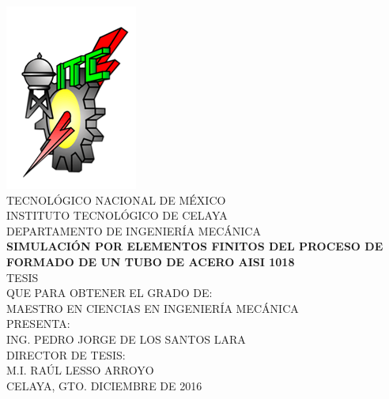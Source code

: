 \begin{titlepage}
\begin{center}
\includegraphics[scale=0.6]{src/logo_tec.PNG} \\[2 mm]
{\large TECNOLÓGICO NACIONAL DE MÉXICO} \\[2 mm]
{\large INSTITUTO TECNOLÓGICO DE CELAYA} \\[2 mm]
{\large DEPARTAMENTO DE INGENIERÍA MECÁNICA} \\[18 mm]

{\Large\bfseries SIMULACIÓN POR ELEMENTOS FINITOS DEL PROCESO DE FORMADO DE UN TUBO DE ACERO AISI 1018} \\[18 mm]

{\large TESIS} \\[18 mm]

{\large QUE PARA OBTENER EL GRADO DE:} \\[2 mm]
{\large MAESTRO EN CIENCIAS EN INGENIERÍA MECÁNICA} \\[18 mm]

{\large PRESENTA: }\\[2 mm]
{\large ING. PEDRO JORGE DE LOS SANTOS LARA} \\[18 mm]

{\large DIRECTOR DE TESIS:} \\[2 mm]
{\large M.I. RAÚL LESSO ARROYO} \\[18 mm]

{\large CELAYA, GTO. \hfill DICIEMBRE DE 2016}
\end{center}
\end{titlepage}